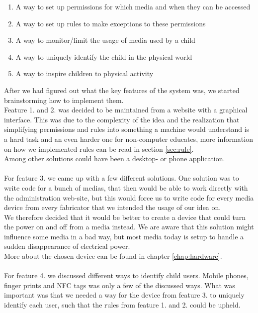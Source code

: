 \begin{enumerate}
	\item A way to set up permissions for which media and when they can be accessed
	\item A way to set up rules to make exceptions to these permissions
	\item A way to monitor/limit the usage of media used by a child
	\item A way to uniquely identify the child in the physical world
	\item A way to inspire children to physical activity
\end{enumerate}

After we had figured out what the key features of the system was, we started brainstorming how to implement them.\\
Feature 1. and 2. was decided to be maintained from a website with a graphical interface. This was due to the complexity of the idea and the realization that simplifying permissions and rules into something a machine would understand is a hard task and an even harder one for non-computer educates, more information on how we implemented rules can be read in section \vref{sec:rule}.\\
Among other solutions could have been a desktop- or phone application.\\
\\
For feature 3. we came up with a few different solutions. One solution was to write code for a bunch of medias, that then would be able to work directly with the administration web-site, but this would force us to write code for every media device from every fabricator that we intended the usage of our idea on.\\
We therefore decided that it would be better to create a device that could turn the power on and off from a media instead. We are aware that this solution might influence some media in a bad way, but most media today is setup to handle a sudden disappearance of electrical power.\\
More about the chosen device can be found in chapter \vref{chap:hardware}.\\
\\
For feature 4. we discussed different ways to identify child users. Mobile phones, finger prints and NFC tags was only a few of the discussed ways. What was important was that we needed a way for the device from feature 3. to uniquely identify each user, such that the rules from feature 1. and 2. could be upheld.\\
